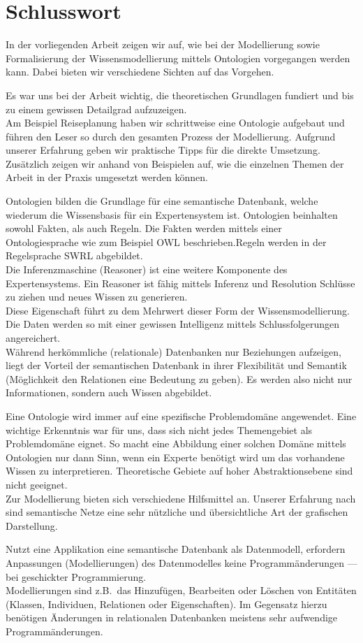 \chapter{Schlusswort}
\label{chap:schlusswort}

In der vorliegenden Arbeit zeigen wir auf, wie bei der Modellierung sowie Formalisierung der Wissensmodellierung mittels Ontologien vorgegangen werden kann. Dabei bieten wir verschiedene Sichten auf das Vorgehen. 

Es war uns bei der Arbeit wichtig, die theoretischen Grundlagen fundiert und bis zu einem gewissen Detailgrad aufzuzeigen. \\
Am Beispiel Reiseplanung haben wir schrittweise eine Ontologie aufgebaut und führen den Leser so durch den gesamten Prozess der Modellierung. Aufgrund unserer Erfahrung geben wir praktische Tipps für die direkte Umsetzung. Zusätzlich zeigen wir anhand von Beispielen auf, wie die einzelnen Themen der Arbeit in der Praxis umgesetzt werden können.

Ontologien bilden die Grundlage für eine semantische Datenbank, welche wiederum die Wissensbasis für ein Expertensystem ist. Ontologien beinhalten sowohl Fakten, als auch Regeln. Die Fakten werden mittels einer Ontologiesprache wie zum Beispiel OWL beschrieben.Regeln werden in der Regelsprache SWRL abgebildet.\\
Die Inferenzmaschine (Reasoner) ist eine weitere Komponente des Expertensystems. Ein Reasoner ist fähig mittels Inferenz und Resolution Schlüsse zu ziehen und neues Wissen zu generieren.\\
Diese Eigenschaft führt zu dem Mehrwert dieser Form der Wissensmodellierung. Die Daten werden so mit einer gewissen Intelligenz mittels Schlussfolgerungen angereichert.\\
Während herkömmliche (relationale) Datenbanken nur Beziehungen aufzeigen, liegt der Vorteil der semantischen Datenbank in ihrer Flexibilität und Semantik (Möglichkeit den Relationen eine Bedeutung zu geben). Es werden also nicht nur Informationen, sondern auch Wissen abgebildet.

Eine Ontologie wird immer auf eine spezifische Problemdomäne angewendet. Eine wichtige Erkenntnis war für uns, dass sich nicht jedes Themengebiet als Problemdomäne eignet. So macht eine Abbildung einer solchen Domäne mittels Ontologien nur dann Sinn, wenn ein Experte benötigt wird um das vorhandene Wissen zu interpretieren.
Theoretische Gebiete auf hoher Abstraktionsebene sind nicht geeignet.\\
Zur Modellierung bieten sich verschiedene Hilfsmittel an. Unserer Erfahrung nach sind semantische Netze eine sehr nützliche und übersichtliche Art der grafischen Darstellung.

Nutzt eine Applikation eine semantische Datenbank als Datenmodell, erfordern Anpassungen (Modellierungen) des Datenmodelles keine Programmänderungen --- bei geschickter Programmierung.\\
Modellierungen sind z.B.\ das Hinzufügen, Bearbeiten oder Löschen von Entitäten (Klassen, Individuen, Relationen oder Eigenschaften).
Im Gegensatz hierzu benötigen Änderungen in relationalen Datenbanken meistens sehr aufwendige Programmänderungen.




